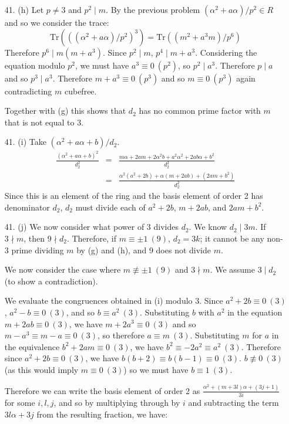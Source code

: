 \documentclass{article}
\newcommand{\trace}[1]{\text{Tr}(#1)}
\begin{document}
\begin{enumerate}
\item[41. (h)] Let $p \neq 3$ and $p^2 \mid m$.  By the previous problem $(\alpha^2 + a\alpha)/p^2 \in R$ and so we consider the trace:
\[ \trace{((\alpha^2 + a\alpha)/p^2)^3} = \trace{(m^2 + a^3 m)/p^6} \]
Therefore $p^6 \mid m(m + a^3)$.  Since $p^2 \mid m$, $p^4 \mid m + a^3$.  Considering the equation modulo $p^2$, we must have $a^3 \equiv 0\ (p^2)$, so $p^2 \mid a^3$.  Therefore $p \mid a$ and so $p^3 \mid a^3$.  Therefore $m + a^3 \equiv 0\ (p^3)$ and so $m \equiv 0\ (p^3)$ again contradicting $m$ cubefree.

Together with (g) this shows that $d_2$ has no common prime factor with $m$ that is not equal to 3.

\item[41. (i)] Take $(\alpha^2 + a\alpha + b)/d_2$.
\begin{eqnarray*}
    \frac{(\alpha^2 + a\alpha + b)^2}{d_2^2} &=& \frac{m\alpha + 2am + 2\alpha^2b + a^2\alpha^2 + 2ab\alpha + b^2}{d_2^2} \\
     &=& \frac{\alpha^2 (a^2 + 2b) + \alpha(m + 2ab) + (2am + b^2)}{d_2^2}
\end{eqnarray*}
Since this is an element of the ring and the basis element of order 2 has denominator $d_2$, $d_2$ must divide each of $a^2 + 2b$, $m + 2ab$, and $2am + b^2$.

\item[41. (j)]  We now consider what power of 3 divides $d_2$.  We know $d_2 \mid 3m$.  If $3 \nmid m$, then $9 \nmid d_2$.  Therefore, if $m \equiv \pm 1\ (9)$, $d_2 = 3k$; it cannot be any non-3 prime dividing $m$ by (g) and (h), and 9 does not divide $m$.

We now consider the case where $m \nequiv \pm 1\ (9)$ and $3 \nmid m$.  We assume $3 \mid d_2$ (to show a contradiction).

We evaluate the congruences obtained in (i) modulo 3.  Since $a^2 + 2b \equiv 0\ (3)$, $a^2 - b \equiv 0\ (3)$, and so $b \equiv a^2\ (3)$.  Substituting $b$ with $a^2$ in the equation $m + 2ab \equiv 0\ (3)$, we have $m + 2a^3 \equiv 0\ (3)$ and so $m - a^3 \equiv m - a \equiv 0\ (3)$, so therefore $a \equiv m\ (3)$.  Substituting $m$ for $a$ in the equivalence $b^2 + 2am \equiv 0\ (3)$, we have $b^2 \equiv -2a^2 \equiv a^2 \ (3)$.  Therefore since $a^2 + 2b \equiv 0\ (3)$, we have $b(b + 2) \equiv b(b - 1) \equiv 0\ (3)$.  $b \not\equiv 0\ (3)$ (as this would imply $m \equiv 0\ (3)$) so we must have $b \equiv 1\ (3)$.

Therefore we can write the basis element of order 2 as $\frac{\alpha^2 + (m + 3l)\alpha + (3j + 1)}{3i}$ for some $i, l, j$, and so by multiplying through by $i$ and subtracting the term $3l\alpha + 3j$ from the resulting fraction, we have:


\end{enumerate}
\end{document}
